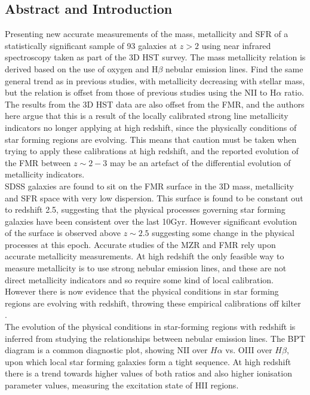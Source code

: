 \documentclass{literature}
\begin{document}
\subsection{Abstract and Introduction}
Presenting new accurate measurements of the mass, metallicity and SFR of a statistically significant sample of 93 galaxies at $z > 2$ using near infrared spectroscopy taken as part of the 3D HST survey. The mass metallicity relation is derived based on the use of oxygen and H$\beta $ nebular emission lines. Find the same general trend as in previous studies, with metallicity decreasing with stellar mass, but the relation is offset from those of previous studies using the NII to H$\alpha$ ratio. The results from the 3D HST data are also offset from the FMR, and the authors here argue that this is a result of the locally calibrated strong line metallicity indicators no longer applying at high redshift, since the physically conditions of star forming regions are evolving. This means that caution must be taken when trying to apply these calibrations at high redshift, and the reported evolution of the FMR between $z \sim 2-3$ may be an artefact of the differential evolution of metallicity indicators.  \\ 
SDSS galaxies are found to sit on the FMR surface in the 3D mass, metallicity and SFR space with very low dispersion. This surface is found to be constant out to redshift 2.5, suggesting that the physical processes governing star forming galaxies have been consistent over the last 10Gyr. However significant evolution of the surface is observed above $z \sim 2.5$ suggesting some change in the physical processes at this epoch. Accurate studies of the MZR and FMR rely upon accurate metallicity measurements. At high redshift the only feasible way to measure metallicity is to use strong nebular emission lines, and these are not direct metallicity indicators and so require some kind of local calibration. However there is now evidence that the physical conditions in star forming regions are evolving with redshift, throwing these empirical calibrations off kilter \citep{Nakajima2013}. \\ 
The evolution of the physical conditions in star-forming regions with redshift is inferred from studying the relationships between nebular emission lines. The BPT diagram is a common diagnostic plot, showing NII over $H\alpha$ vs. OIII over $H\beta$, upon which local star forming galaxies form a tight sequence. At high redshift there is a trend towards higher values of both ratios and also higher ionisation parameter values, measuring the excitation state of HII regions. 
\end{document}

